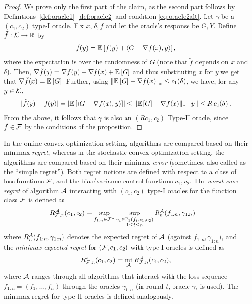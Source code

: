 \begin{proof}
We prove only the first part of the claim, as the second part follows by Definitions~\ref{def:oracle1}--\ref{def:oracle2} and condition \eqref{eq:oracle2alt}.
Let $\gamma$ be  a $(c_1,c_2)$ type-I oracle. Fix $x$, $\delta,f$ and let the oracle's response be $G,Y$. 
Define $\tilde{f}:\mathcal{K} \to \mathbb{R}$ by
\[\tilde{f}(y) =\mathbb{E}\left[ f(y)+ \langle G-\nabla f(x) , y \rangle\right],\]
where the expectation is over the randomness of $G$ (note that $\tilde{f}$ depends on $x$ and $\delta$).
Then, $\nabla \tilde{f}(y) =  \nabla f(y)-\nabla f(x) + \mathbb{E}\left[G\right]$
and thus substituting $x$ for $y$ we get that $\nabla \tilde{f}(x) = \mathbb{E}\left[G\right]$.
Further, 
using $\left\| \mathbb{E}\left[G\right]  - \nabla f(x)  \right\|_* \le c_1(\delta) $,
we have, for any $y \in \mathcal{K}$,
\begin{align*}
|\tilde{f}(y)-f(y)|
=
\left| \mathbb{E}\left[\langle G-\nabla f(x), y \rangle\right]\right|
 \le \large\|\mathbb{E}\left[G\right]-\nabla f(x)\large\|_* \, \left\|y\right\|
 \le  R\,c_1(\delta)\,.
\end{align*}
From the above, it follows that $\gamma$ is also an $(Rc_1,c_2)$ Type-II oracle, since $\tilde{f}\in\mathcal{F}$ by the conditions of the proposition. 
\end{proof}

In the online convex optimization setting,
algorithms are compared based on their minimax \emph{regret}, 
whereas in the stochastic convex optimization setting, the algorithms are compared based on their
 minimax \emph{error}
 (sometimes, also called as the ``simple regret'').
Both regret notions are defined with respect to a class of loss functions $\mathcal{F}$, and the bias/variance control functions $c_1,c_2$.
The \emph{worst-case regret} of algorithm $\mathcal{A}$ interacting with $(c_1,c_2)$ type-I oracles for the function class $\mathcal{F}$ is
defined as
\begin{align*}
R_{\mathcal{F},n}^{\mathcal{A}}(c_1,c_2)
&=  \sup_{f_{1:n}\in \mathcal{F}^n}
	\sup_{\substack{\gamma_t \in \Gamma_1(f_t,c_1,c_2)\\1\le t \le n
	}} R_n^{\mathcal{A}}(f_{1:n},\gamma_{1:n})
\end{align*}
where $R_n^{\mathcal{A}}(f_{1:n},\gamma_{1:n})$ denotes the expected regret of $\mathcal{A}$ (against $f_{1:n},\gamma_{1:n}$), and
the \emph{minimax expected regret} for $(\mathcal{F},c_1,c_2)$ with type-I oracles is defined as
\[
R_{\mathcal{F},n}^*(c_1,c_2) = \inf_{\mathcal{A}} R_{\mathcal{F},n}^{\mathcal{A}}(c_1,c_2),
\]
where $\mathcal{A}$ ranges through all algorithms that interact with the loss sequence  $f_{1:n}= (f_1,\dots,f_n)$
through the oracles $\gamma_{1:n}$ (in round $t$, oracle $\gamma_t$ is used).
The minimax regret for type-II oracles is defined analogously.


